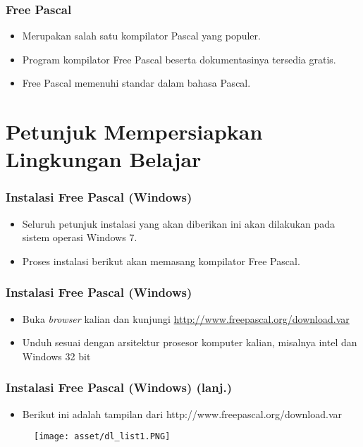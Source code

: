 \begin{frame}
\frametitle{Free Pascal}
\begin{itemize}
  \item Merupakan salah satu kompilator Pascal yang populer.
  \item Program kompilator Free Pascal beserta dokumentasinya tersedia gratis.
  \item Free Pascal memenuhi standar dalam bahasa Pascal.
\end{itemize}
\end{frame}

\section{Petunjuk Mempersiapkan \newline Lingkungan Belajar}
\frame{\sectionpage}

\begin{frame}
\frametitle{Instalasi Free Pascal (Windows)}
\begin{itemize}
  \item Seluruh petunjuk instalasi yang akan diberikan ini akan dilakukan pada sistem operasi Windows 7.
  \item Proses instalasi berikut akan memasang kompilator Free Pascal.
\end{itemize}
\end{frame}

\begin{frame}
\frametitle{Instalasi Free Pascal (Windows)}
\begin{itemize}
  \item Buka \textit{browser} kalian dan kunjungi \href{http://www.freepascal.org/download.var}{http://www.freepascal.org/download.var}
  \item Unduh sesuai dengan arsitektur prosesor komputer kalian, misalnya intel dan Windows 32 bit
\end{itemize}
\end{frame}

\begin{frame}
\frametitle{Instalasi Free Pascal (Windows) (lanj.)}
\begin{itemize}
  \item Berikut ini adalah tampilan dari http://www.freepascal.org/download.var
\end{itemize}
\begin{figure}
  \texttt{[image: asset/dl\_list1.PNG]}
\end{figure}
\end{frame}

